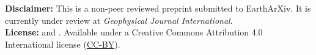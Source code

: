 \documentclass[twocolumn,10pt]{article}
\newcommand{\Author}{%
  \SolerShort{} \& \UiedaShort
}
\newcommand{\AuthorLong}{%
  \Soler{} and \Uieda
}
\newcommand{\AuthorAffil}{%
    {\large
      \Soler$^{1,2}$ \orcidlink{\SolerORCID} and
        \Uieda$^{3}$ \orcidlink{\UiedaORCID}
    }
    \\[0.4cm]
    {\small $^{1}$\CONICET (\SolerMail)} \\
    {\small $^{2}$\IGSV} \\
    {\small $^{3}$\Liverpool} \\
}
\begin{document}
\title{\Title}
\author{\AuthorAffil}
\date{
    \normalsize
    \today
}
\maketitle

\noindent
\textbf{Disclaimer:}
This is a non-peer reviewed preprint submitted to EarthArXiv.
It is currently under review at \textit{Geophysical Journal International}.
\\[0.5cm]
\noindent
\textbf{License:}
\textcopyright{} \the\year{} \AuthorLong{}.
Available under a Creative Commons Attribution 4.0 International license
(\href{https://creativecommons.org/licenses/by/4.0/}{CC-BY}).


\begin{abstract}
    
\end{abstract}











\end{document}
